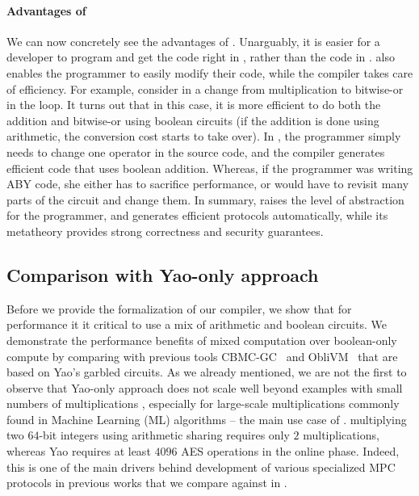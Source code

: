 \paragraph{Advantages of \tool} We can now concretely see the advantages of \tool. Unarguably, it is
easier for a developer to program and get the code right in
, rather than the code in
.
\tool also enables the
programmer to easily modify their code, while the compiler takes care
of efficiency. For example, consider in  a
change from multiplication to bitwise-or in the  loop. It
turns out that in this case, it is more efficient to do both
the addition and bitwise-or using boolean circuits (if the addition is
done using arithmetic, the conversion cost starts to take
over). In \tool, the programmer simply needs to change one operator in
the source code, and the compiler generates efficient code that uses
boolean addition. Whereas, if the programmer was writing ABY
code, she either has to sacrifice performance, or would have to
revisit many parts of the circuit and change them. In summary, \tool raises the level of abstraction for the
programmer, and generates efficient \mpc protocols automatically,
while its metatheory provides strong correctness and security
guarantees. 

\subsection{Comparison with Yao-only approach}
Before we provide the formalization of our compiler, we show that for performance it it critical to use a mix of arithmetic and boolean circuits.
We demonstrate the performance benefits of mixed computation over boolean-only compute by comparing with previous tools CBMC-GC~\cite{cbmcgc} and ObliVM~\cite{oblivm} that are based on Yao's garbled circuits. As we already mentioned,  we are not the first to observe that Yao-only approach does not scale well beyond examples with small numbers of multiplications \cite{aby,tasty,autoS,secureml,minionn,chameleon}, especially for large-scale multiplications commonly found in Machine Learning (ML) algorithms -- the main use case of \tool.  
 multiplying two $64$-bit integers using arithmetic sharing requires only $2$ multiplications, whereas Yao requires at least $4096$ AES operations in the online phase.
Indeed, this is one of the main drivers behind development of various specialized MPC protocols in previous works \cite{secureml,minionn,shafindss} that we compare against in .

